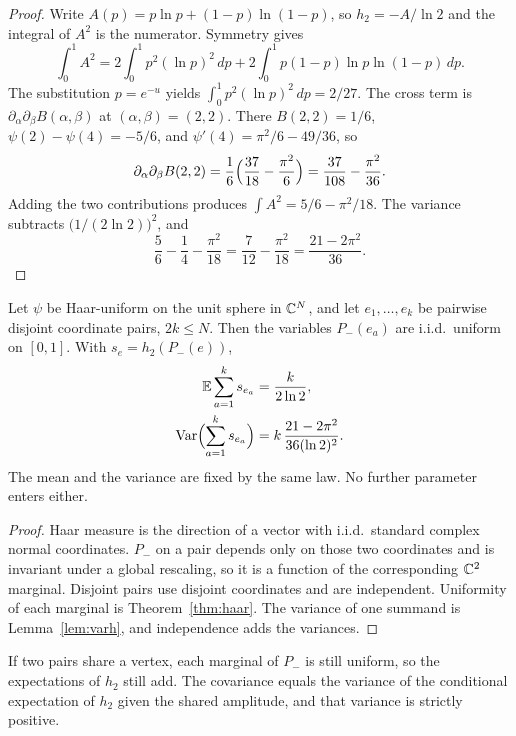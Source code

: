 \begin{proof}
Write \(A(p)=p\ln p+(1-p)\ln(1-p)\), so \(h_2=-A/\ln 2\) and the
integral of \(A^2\) is the numerator.
Symmetry gives
\[
\int_0^1 A^2
=2\int_0^1 p^2(\ln p)^2\,dp
+2\int_0^1 p(1-p)\ln p\ln(1-p)\,dp.
\]
The substitution \(p=e^{-u}\) yields
\(\int_0^1 p^2(\ln p)^2\,dp=2/27\).
The cross term is \(\partial_\alpha\partial_\beta B(\alpha,\beta)\) at
\((\alpha,\beta)=(2,2)\).
There \(B(2,2)=1/6\), \(\psi(2)-\psi(4)=-5/6\), and
\(\psi'(4)=\pi^2/6-49/36\), so
\[
\partial_\alpha\partial_\beta B(2,2)
=\frac1{6}\Bigl(\frac{37}{18}-\frac{\pi^2}{6}\Bigr)
=\frac{37}{108}-\frac{\pi^2}{36}.
\]
Adding the two contributions produces
\(\int A^2=5/6-\pi^2/18\).
The variance subtracts
\(\bigl(1/(2\ln 2)\bigr)^2\), and
\[
\frac56-\frac14-\frac{\pi^2}{18}
=\frac{7}{12}-\frac{\pi^2}{18}
=\frac{21-2\pi^2}{36}.
\]
\end{proof}

\begin{theorem}
\label{thm:disjoint}
Let \(\psi\) be Haar-uniform on the unit sphere in \(\mathbb{C}^N\), and let
\(e_1,\ldots,e_k\) be pairwise disjoint coordinate pairs, \(2k\le N\).
Then the variables \(P_-(e_a)\) are i.i.d.\ uniform on \([0,1]\).
With \(s_e=h_2(P_-(e))\),
\begin{align*}
\mathbb{E}\sum_{a=1}^k s_{e_a}
&=\frac{k}{2\ln 2},\\
\mathrm{Var}\Bigl(\sum_{a=1}^k s_{e_a}\Bigr)
&=k\,\frac{21-2\pi^2}{36(\ln 2)^2}.
\end{align*}
The mean and the variance are fixed by the same law.
No further parameter enters either.
\end{theorem}

\begin{proof}
Haar measure is the direction of a vector with i.i.d.\ standard complex
normal coordinates.
\(P_-\) on a pair depends only on those two coordinates and is invariant
under a global rescaling, so it is a function of the corresponding
\(\mathbb{C}^2\) marginal.
Disjoint pairs use disjoint coordinates and are independent.
Uniformity of each marginal is Theorem~\ref{thm:haar}.
The variance of one summand is Lemma~\ref{lem:varh}, and independence
adds the variances.
\end{proof}

\begin{proposition}
\label{prop:cov}
If two pairs share a vertex, each marginal of \(P_-\) is still uniform,
so the expectations of \(h_2\) still add.
The covariance equals the variance of the conditional expectation of
\(h_2\) given the shared amplitude, and that variance is strictly positive.
\end{proposition}

